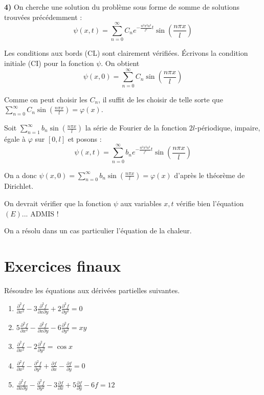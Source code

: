 \documentclass[12pt]{article}
\newcounter{exercice}
\begin{document}
\begin{corrige}
\textbf{4)} On cherche une solution du problème sous forme de somme de solutions trouvées précédemment :
$$
\psi(x, t) = \sum_{n=0}^{\infty} C_{n} e^{-\frac{n^{2} \pi^{2} a^{2}}{l^{2}} t} \sin\left(\frac{n \pi x}{l}\right)
$$

Les conditions aux bords (CL) sont clairement vérifiées. Écrivons la condition initiale (CI) pour la fonction $\psi$. On obtient
$$
\psi(x, 0) = \sum_{n=0}^{\infty} C_{n} \sin\left(\frac{n \pi x}{l}\right)
$$

Comme on peut choisir les $C_{n}$, il suffit de les choisir de telle sorte que $\sum_{n=0}^{\infty} C_{n} \sin\left(\frac{n \pi x}{l}\right) = \varphi(x)$.

Soit $\sum_{n=1}^{\infty} b_{n} \sin\left(\frac{n \pi x}{l}\right)$ la série de Fourier de la fonction $2l$-périodique, impaire, égale à $\varphi$ sur $[0, l]$ et posons :
$$
\psi(x, t) = \sum_{n=0}^{\infty} b_{n} e^{-\frac{n^{2} \pi^{2} a^{2}}{l^{2}} t} \sin\left(\frac{n \pi x}{l}\right)
$$

On a donc $\psi(x, 0) = \sum_{n=0}^{\infty} b_{n} \sin\left(\frac{n \pi x}{l}\right) = \varphi(x)$ d'après le théorème de Dirichlet.

On devrait vérifier que la fonction $\psi$ aux variables $x, t$ vérifie bien l'équation $(E)$... ADMIS !

On a résolu dans un cas particulier l'équation de la chaleur.
\end{corrige}

\section{Exercices finaux}

\begin{exercice}
Résoudre les équations aux dérivées partielles suivantes.
\begin{enumerate}
  \item $\frac{\partial^{2} f}{\partial x^{2}} - 3 \frac{\partial^{2} f}{\partial x \partial y} + 2 \frac{\partial^{2} f}{\partial y^{2}} = 0$
  \item $5 \frac{\partial^{2} f}{\partial x^{2}} - \frac{\partial^{2} f}{\partial x \partial y} - 6 \frac{\partial^{2} f}{\partial y^{2}} = xy$
  \item $\frac{\partial^{2} f}{\partial x^{2}} - 2 \frac{\partial^{2} f}{\partial y^{2}} = \cos x$
  \item $\frac{\partial^{2} f}{\partial x^{2}} - \frac{\partial^{2} f}{\partial y^{2}} + \frac{\partial f}{\partial x} - \frac{\partial f}{\partial y} = 0$
  \item $\frac{\partial^{2} f}{\partial x \partial y} - \frac{\partial^{2} f}{\partial y^{2}} - 3 \frac{\partial f}{\partial x} + 5 \frac{\partial f}{\partial y} - 6f = 12$
\end{enumerate}
\end{exercice}
\end{document}
